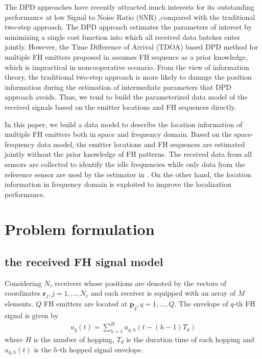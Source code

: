 \documentclass[journal,10pt]{IEEEtran}
\begin{document}
The DPD approaches \cite{Weiss2004Direct,Weiss2011Direct,HighResolutionKG} have recently attracted much interests for its outstanding performance at low Signal to Noise Ratio (SNR) ,compared with the traditional two-step approach. 
The DPD approach estimates the parameters of interest by minimizing a single cost function into which all received data batches enter jointly.
However, the Time Difference of Arrival (TDOA) based DPD method for multiple FH emitters proposed in \cite{ouyang2017direct} assumes FH sequence as a prior knowledge, which is impractical in noncooperative scenario.
From the view of information theory, the traditional two-step approach is more likely to damage the position information during the estimation of intermediate parameters that DPD approach avoids.
Thus, we tend to build the parameterized data model of the received signals based on the emitter locations and FH sequences directly.

In this paper, we build a data model to describe the location information of multiple FH emitters both in space and frequency domain. 
Based on the space-frequency data model, the emitter locations and FH sequences are estimated jointly without the prior knowledge of FH patterns.
The received data from all sensors are collected to identify the idle frequencies while only data from the reference sensor are used by the estimator in \cite{liu2002blind}.
On the other hand, the location information in frequency domain is exploited to improve the localization performance. 

\section{Problem formulation}
\label{sec:model}

\subsection{the received FH signal model}
Considering $N_r$ receivers whose positions are denoted by the vectors of coordinates 
$\boldsymbol{r}_j,j=1,\dots,N_r$ and each receiver is equipped with an array of $M$ elements. $Q$ FH emitters are located at $\boldsymbol{p}_q,q=1,\dots,Q$. The envelope of $q$-th FH signal is given by
\begin{align}\label{eq:1}
    u_q(t)=\sum_{h=1}^H u_{q,h}(t-(h-1)T_d)
\end{align} 
where $H$ is the number of hopping, $T_d$ is the duration time of each hopping and $u_{q,h}(t)$ is the $h$-th hopped signal envelope.
\end{document}
